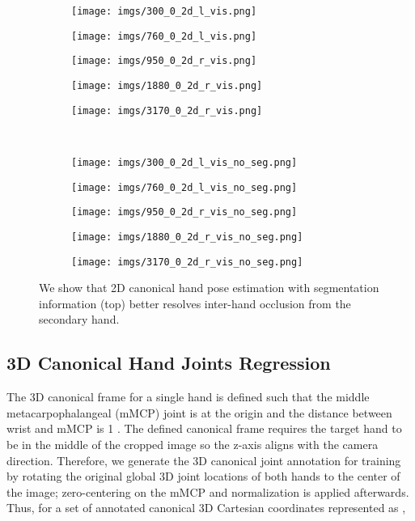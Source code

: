 \documentclass[10pt,twocolumn,letterpaper]{article}
\begin{document}
\begin{figure}[t]
  \centering
  \begin{subfigure}[t]{0.19\linewidth}
    \texttt{[image: imgs/300\_0\_2d\_l\_vis.png]}
  \end{subfigure}
  \begin{subfigure}[t]{0.19\linewidth}
    \texttt{[image: imgs/760\_0\_2d\_l\_vis.png]}
  \end{subfigure}
  \begin{subfigure}[t]{0.19\linewidth}
    \texttt{[image: imgs/950\_0\_2d\_r\_vis.png]}
  \end{subfigure}
  \begin{subfigure}[t]{0.19\linewidth}
    \texttt{[image: imgs/1880\_0\_2d\_r\_vis.png]}
  \end{subfigure}
  \begin{subfigure}[t]{0.19\linewidth}
    \texttt{[image: imgs/3170\_0\_2d\_r\_vis.png]}
  \end{subfigure}\\
  \begin{subfigure}[t]{0.19\linewidth}
    \texttt{[image: imgs/300\_0\_2d\_l\_vis\_no\_seg.png]}
  \end{subfigure}
  \begin{subfigure}[t]{0.19\linewidth}
    \texttt{[image: imgs/760\_0\_2d\_l\_vis\_no\_seg.png]}
  \end{subfigure}
  \begin{subfigure}[t]{0.19\linewidth}
    \texttt{[image: imgs/950\_0\_2d\_r\_vis\_no\_seg.png]}
  \end{subfigure}
  \begin{subfigure}[t]{0.19\linewidth}
    \texttt{[image: imgs/1880\_0\_2d\_r\_vis\_no\_seg.png]}
  \end{subfigure}
  \begin{subfigure}[t]{0.19\linewidth}
    \texttt{[image: imgs/3170\_0\_2d\_r\_vis\_no\_seg.png]}
  \end{subfigure}
  \caption{We show that 2D canonical hand pose estimation with segmentation information (top) better resolves inter-hand occlusion from the secondary hand.}
  \label{fig:seg_2d_demo_img}
\end{figure}
\subsection{3D Canonical Hand Joints Regression}\label{sec:3d_can}
\indent The 3D canonical frame for a single hand is defined such that the middle metacarpophalangeal (mMCP) joint is at the origin and the distance between wrist and mMCP is 1 \cite{Mueller}. The defined canonical frame requires the target hand to be in the middle of the cropped image so the z-axis aligns with the camera direction. Therefore, we generate the 3D canonical joint annotation for training by rotating the original global 3D joint locations of both hands to the center of the image; zero-centering on the mMCP and normalization is applied afterwards. Thus, for a set of annotated canonical 3D Cartesian coordinates represented as , \\
\end{document}

